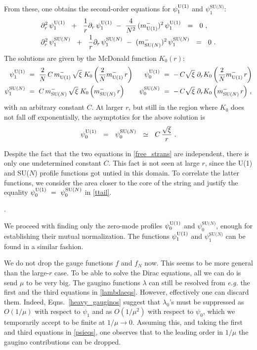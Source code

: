 \documentclass[12pt]{article}
\def\beq{\begin{equation}}
\def\eeq{\end{equation}}
\newcommand{\p}{\partial}
\newcommand{\mUm}{m_{\rm U(1)}^{-}}
\newcommand{\mNm}{m_\text{SU($N$)}^{-}}
\newcommand{\poU}{\psi_0^{\rm U(1)}}
\newcommand{\plU}{\psi_1^{\rm U(1)}}
\newcommand{\poN}{\psi_0^\text{SU($N$)}}
\newcommand{\plN}{\psi_1^\text{SU($N$)}}
\begin{document}
	From these, one obtains the second-order equations for $ \plU $ and $ \plN $:
\begin{align}
%
\notag
	& \p_r^2\, \plU  ~~+~~ \frac{1}{r}\p_r\, \plU ~-~ \frac{4}{N^2}\,(\mUm)^2\, \plU  ~~=~~ 0~, \\
%
\label{free_strans}
	& \p_r^2\, \plN  ~~+~~ \frac{1}{r}\p_r\, \plN ~-~ (\mNm)^2\, \plN ~~=~~ 0~.
\end{align}
	The solutions are given by the McDonald function $ K_0(r) $:
\begin{align*}
%
	\plU & ~=~ \frac{2}{N}\,C\,\mUm\,\sqrt{\xi}\;K_0\left(\frac{2}{N}\mUm\,r\right)  
&
	\poU & ~=~ -\,C\sqrt{\xi}\; \p_r K_0\left(\frac{2}{N}\mUm\,r\right)
\\
%
	\plN & ~=~ C\,\mNm\,\sqrt{\xi}\; K_0\left(\mNm\, r\right)
&
	\poN & ~=~ -\,C\sqrt{\xi}\; \p_r K_0\left(\mNm\,r\right)\,,
\end{align*}
	with an arbitrary constant $ C $.
	At larger $ r $, but still in the region where $ K_0 $ does not fall off exponentially,
	the asymptotics for the above solution is
\beq
\label{ttail}
	\poU ~~=~~ \poN ~~\simeq~~ C\,\frac{\sqrt{\xi}}{r}~.
\eeq

	Despite the fact that the two equations in \eqref{free_strans} are independent,
	there is only one undetermined constant $ C $.
	This fact is not seen at large $ r $, since the U(1) and SU($N$) profile functions got untied
	in this domain.
	To correlate the latter functions, we consider the area closer to the core of the string and
	justify the equality $ \poU ~=~ \poN $ in \eqref{ttail}.

	{.}

	We proceed with finding only the zero-mode profiles $ \poU $ and $ \poN $, enough for establishing
	their mutual normalization.
	The functions $ \plU $ and $ \plN $ can be found in a similar fashion. 

	We do not drop the gauge functions $ f $ and $ f_N $ now.
	This seems to be more general than the large-$ r $ case.
	To be able to solve the Dirac equations, all we can do is send $ \mu $ to be very big.
	The gaugino functions $ \lambda $ can still be resolved from {\it e.g.} the first and the
	third equations in \eqref{lambdaeqs}.
	However, effectively one can discard them.
	Indeed, Eqns.~\eqref{heavy_gauginos} suggest that $ \lambda_0 $'s must be suppressed as $ O(1/\mu) $
	with respect to $ \psi_1 $ and as $ O(1/\mu^2) $ with respect to $ \psi_0 $, which we temporarily
	accept to be finite at $ 1/\mu \to 0 $.
	Assuming this, and taking the first and third equations in \eqref{psieqs}, one observes
	that to the leading order in $ 1/\mu $ the gaugino contributions can be dropped.
\end{document}
